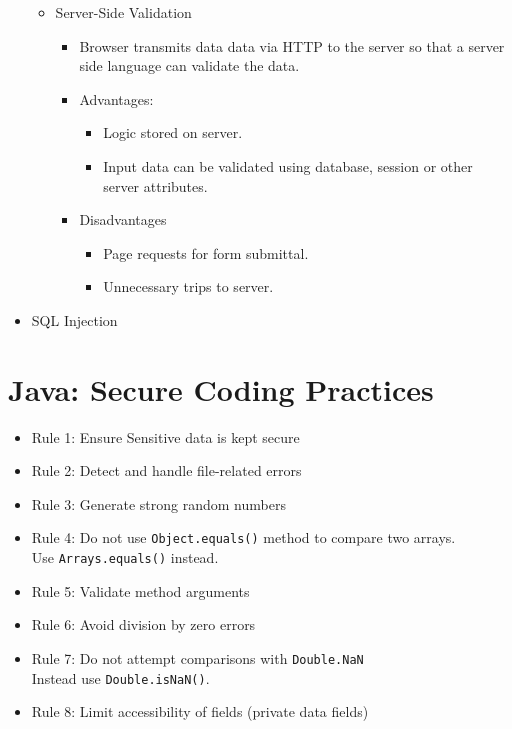 \documentclass[12pt]{article}
\begin{document}
\begin{itemize}
\begin{itemize}
\begin{itemize}
				\end{itemize}
			\item Server-Side Validation
				\begin{itemize}
					\item Browser transmits data data via HTTP to the server so that a
						server side language can validate the data.
					\item Advantages:
						\begin{itemize}
							\item Logic stored on server.
							\item Input data can be validated using database,
								session or other server attributes.
						\end{itemize}
					\item Disadvantages
						\begin{itemize}
							\item Page requests for form submittal.
							\item Unnecessary trips to server.
						\end{itemize}
				\end{itemize}
		\end{itemize}
	\item SQL Injection
\end{itemize}


\section{Java: Secure Coding Practices}
\begin{itemize}
	\item Rule 1: Ensure Sensitive data is kept secure
	\item Rule 2: Detect and handle file-related errors
	\item Rule 3: Generate strong random numbers
	\item Rule 4: Do not use \verb|Object.equals()| method to compare two arrays.\\
		Use \verb|Arrays.equals()| instead.
	\item Rule 5: Validate method arguments
	\item Rule 6: Avoid division by zero errors
	\item Rule 7: Do not attempt comparisons with \verb|Double.NaN|\\
		Instead use \verb|Double.isNaN()|.
	\item Rule 8: Limit accessibility of fields (private data fields)
\end{itemize}
\end{document}

